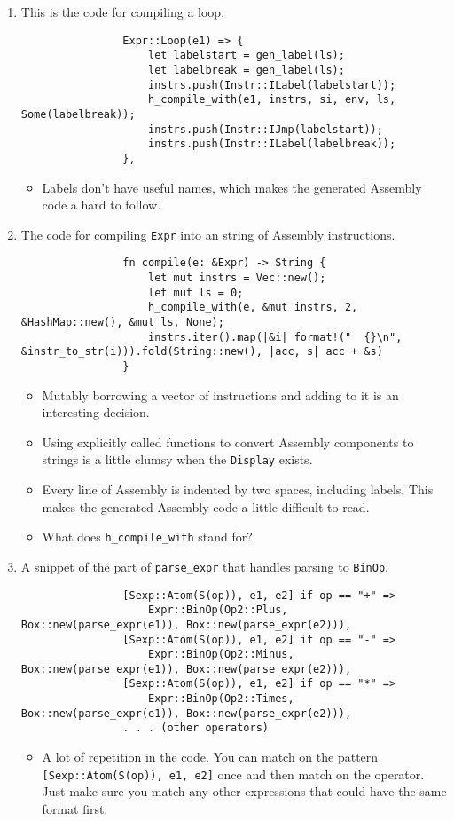 	\begin{enumerate}
		\item This is the code for compiling a loop.
			\begin{lstlisting}
				Expr::Loop(e1) => {
				    let labelstart = gen_label(ls);
				    let labelbreak = gen_label(ls);
				    instrs.push(Instr::ILabel(labelstart));
				    h_compile_with(e1, instrs, si, env, ls, Some(labelbreak));
				    instrs.push(Instr::IJmp(labelstart));
				    instrs.push(Instr::ILabel(labelbreak));
				},
			\end{lstlisting}

			\begin{itemize}
				\item Labels don't have useful names, which makes the generated Assembly code a hard to follow.
			\end{itemize}
		\item The code for compiling \verb|Expr| into an string of Assembly instructions.
			\begin{lstlisting}
				fn compile(e: &Expr) -> String {
				    let mut instrs = Vec::new();
				    let mut ls = 0;
				    h_compile_with(e, &mut instrs, 2, &HashMap::new(), &mut ls, None);
				    instrs.iter().map(|&i| format!("  {}\n", &instr_to_str(i))).fold(String::new(), |acc, s| acc + &s)
				}
			\end{lstlisting}
			\begin{itemize}
				\item Mutably borrowing a vector of instructions and adding to it is an interesting decision.
				\item Using explicitly called functions to convert Assembly components to strings is a little clumsy when the \verb|Display| exists.
				\item Every line of Assembly is indented by two spaces, including labels. This makes the generated Assembly code a little difficult to read.
				\item What does \verb|h_compile_with| stand for?
			\end{itemize}

		\item A snippet of the part of \verb|parse_expr| that handles parsing to \verb|BinOp|.
			\begin{lstlisting}
				[Sexp::Atom(S(op)), e1, e2] if op == "+" =>
				    Expr::BinOp(Op2::Plus, Box::new(parse_expr(e1)), Box::new(parse_expr(e2))),
				[Sexp::Atom(S(op)), e1, e2] if op == "-" =>
				    Expr::BinOp(Op2::Minus, Box::new(parse_expr(e1)), Box::new(parse_expr(e2))),
				[Sexp::Atom(S(op)), e1, e2] if op == "*" =>
				    Expr::BinOp(Op2::Times, Box::new(parse_expr(e1)), Box::new(parse_expr(e2))),
				. . . (other operators)
			\end{lstlisting}
			\begin{itemize}
				\item A lot of repetition in the code. You can match on the pattern \verb|[Sexp::Atom(S(op)), e1, e2]| once and then match on the operator. Just make sure you match any other expressions that could have the same format first:


\end{itemize}
\end{enumerate}
